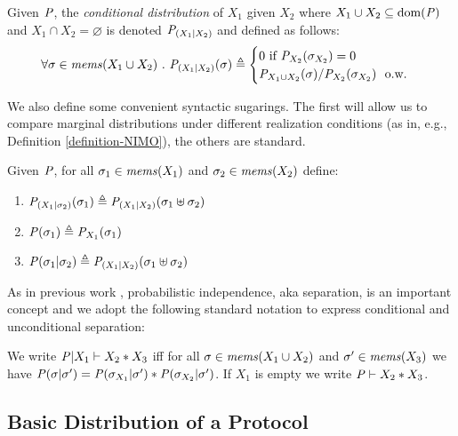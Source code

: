 \begin{definition}
  Given $\mathit{P}$, the \emph{conditional distribution}
  of $X_1$ given $X_2$ where $X_1 \cup X_2 \subseteq \mathrm{dom}(\mathit{P})$ and $X_1 \cap X_2 = \varnothing$
  is denoted $\mathit{P}_{({X_1}|{X_2})}$ and defined as follows:
  $$
  \forall \store \in \mems(X_1 \cup X_2)\ .\ 
  \condd{\pmf}{X_1}{X_2}(\store) \defeq
  \begin{cases}
    0 \text{\ if\ } \margd{\pmf}{X_2}(\store_{X_2}) = 0\\
    \margd{\pmf}{X_1 \cup X_2}(\store) / \margd{\pmf}{X_2}(\store_{X_2})\ \text{\ o.w.}
  \end{cases}
  $$
\end{definition}
We also define some convenient syntactic sugarings. The first will allow us to
compare marginal distributions under different realization conditions
(as in, e.g., Definition \ref{definition-NIMO}), the others are standard.
\begin{definition}
  Given $\mathit{P}$, for all $\sigma_1 \in \mathit{mems}(X_1)$ and $\sigma_2 \in \mathit{mems}(X_2)$ define:
  \begin{enumerate}
  \item $\mathit{P}_{({X_1}|{\sigma_2})}(\sigma_1) \triangleq \mathit{P}_{({X_1}|{X_2})}(\sigma_1 \uplus \sigma_2)$
  \item $\mathit{P}(\sigma_1)  \triangleq {\mathit{P}}_{X_1}(\sigma_1)$ 
  \item $\mathit{P}(\sigma_1|\sigma_2) \triangleq \mathit{P}_{({X_1}|{X_2})}(\sigma_1 \uplus \sigma_2)$
  \end{enumerate}
\end{definition}
As in previous work \cite{darais2019language,barthe2019probabilistic,skalka-near-ppdp24,li2023lilac}, 
probabilistic independence, aka separation, is an important concept and we adopt the
following standard notation to express conditional and unconditional separation:
\begin{definition}
  We write $\mathit{P}|X_1 \vdash X_2 * X_3$ iff for all
    $\sigma \in \mathit{mems}(X_1 \cup X_2)$ and $\sigma' \in \mathit{mems}(X_3)$ we have
  $\mathit{P}(\sigma|\sigma') =
  \mathit{P}(\sigma_{X_1}|\sigma') * \mathit{P}(\sigma_{X_2}|\sigma')$. If $X_1$ is empty
  we write $\mathit{P} \vdash X_2 * X_3$.
\end{definition}

\subsection{Basic Distribution of a Protocol}


